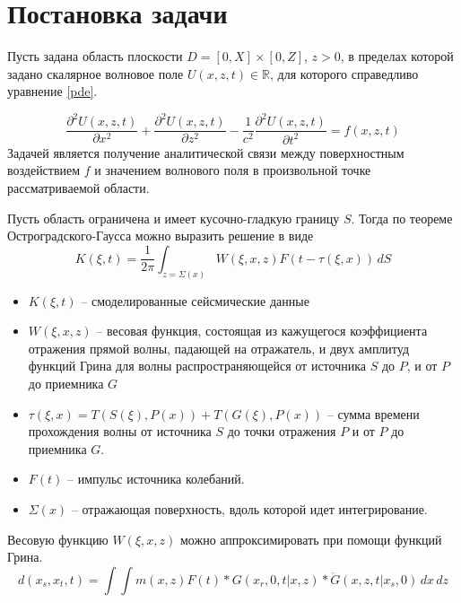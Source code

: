 \documentclass[a4paper, fontsize=14pt]{article}
\begin{document}
\section{Постановка задачи}
Пусть задана область плоскости $D=[0,X]\times[0,Z]$, $z>0$, в пределах которой задано скалярное волновое поле $U(x,z,t)\in\mathbb{R}$, для которого справедливо уравнение \ref{pde}.
 
\begin{equation}
	\label{pde}
	\frac{\partial^2 U(x,z,t)}{\partial x^2} + \frac{\partial^2 U(x,z,t)}{\partial z^2} -  \frac{1}{c^2}\frac{\partial^2 U(x,z,t)}{\partial t^2} = f(x,z,t)
\end{equation}
Задачей является получение аналитической связи
между поверхностным воздействием $f$ и значением волнового поля в произвольной точке рассматриваемой области.


Пусть область ограничена и имеет кусочно-гладкую границу $S$.
Тогда по теореме Остроградского-Гаусса можно выразить решение в виде
\begin{equation}
	K(\xi,t) = \frac{1}{2\pi}\int_{z=\Sigma(x)}W(\xi,x,z)  F(t-\tau(\xi,x))\,dS
\end{equation}
\begin{itemize}
	\item $K(\xi,t)$ -- смоделированные сейсмические данные 
	\item $W(\xi,x,z)$ -- весовая функция, состоящая из кажущегося коэффициента отражения прямой волны, падающей на отражатель, и двух амплитуд функций Грина для волны распространяющейся от источника $S$ до $P$, и от $P$ до приемника $G$
				\item $\tau(\xi,x) = T(S(\xi), P(x)) + T(G(\xi), P(x))$ -- сумма времени прохождения волны от
	источника $S$ до точки отражения $P$ и от $P$ до приемника $G$.
	\item $F(t)$ -- импульс источника колебаний.
	\item $\Sigma(x)$ -- отражающая поверхность, вдоль которой идет интегрирование.
\end{itemize}

	Весовую функцию $W(\xi,x,z)$ можно аппроксимировать при помощи функций Грина.
	\begin{equation*}
		\label{demG}
		d(x_s,x_t,t) = \int \int m(x,z) F(t) * G(x_r,0,t|x,z) * \ddot{G}(x,z,t|x_s,0) \,dx\,dz
	\end{equation*}
	
\end{document}
